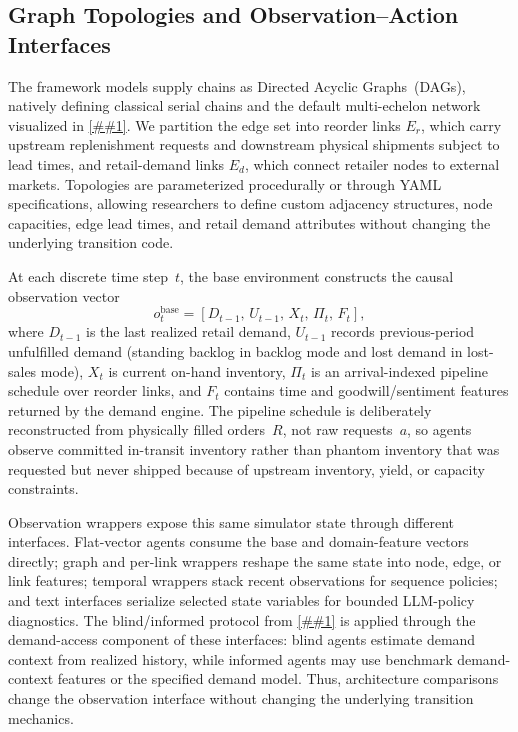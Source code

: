 \documentclass[10pt,a4paper]{article}
\providecommand{\Cref}[1]{\ref{##1}}
\begin{document}
\subsection{Graph Topologies and Observation--Action Interfaces}

The framework models supply chains as Directed Acyclic Graphs~(DAGs),
natively defining classical serial chains and the default
multi-echelon network visualized in \Cref{fig:topologies}. We
partition the edge set into reorder links $E_r$, which carry upstream
replenishment requests and downstream physical shipments subject to lead
times, and retail-demand links $E_d$, which connect retailer nodes to
external markets. Topologies are parameterized procedurally or through
YAML specifications, allowing researchers to define custom adjacency
structures, node capacities, edge lead times, and retail demand
attributes without changing the underlying transition code.

At each discrete time step~$t$, the base environment constructs the
causal observation vector
\[
  o_t^{\mathrm{base}}
    = [D_{t-1},\, U_{t-1},\, X_t,\, \Pi_t,\, F_t],
\]
where $D_{t-1}$ is the last realized retail demand, $U_{t-1}$ records
previous-period unfulfilled demand (standing backlog in backlog mode and
lost demand in lost-sales mode), $X_t$ is current on-hand inventory,
$\Pi_t$ is an arrival-indexed pipeline schedule over reorder links, and
$F_t$ contains time and goodwill/sentiment features returned by the demand
engine. The pipeline schedule is deliberately reconstructed from
physically filled orders~$R$, not raw requests~$a$, so agents observe
committed in-transit inventory rather than phantom inventory that was
requested but never shipped because of upstream inventory, yield, or
capacity constraints.

Observation wrappers expose this same simulator state through different
interfaces. Flat-vector agents consume the base and domain-feature
vectors directly; graph and per-link wrappers reshape the same state into
node, edge, or link features; temporal wrappers stack recent observations
for sequence policies; and text interfaces serialize selected state
variables for bounded LLM-policy diagnostics. The blind/informed protocol
from \Cref{sec:information_protocol} is applied through the demand-access
component of these interfaces: blind agents estimate demand context from realized
history, while informed agents may use benchmark demand-context features
or the specified demand model. Thus, architecture comparisons change the
observation interface without changing the underlying transition
mechanics.
\end{document}
